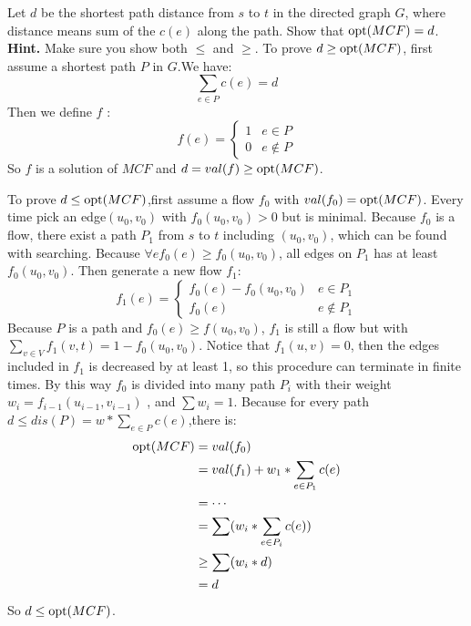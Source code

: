 \documentclass[11pt,a4paper,oneside]{article}
\newcommand{\opt}{\textup{\textrm{opt}}}
\begin{document}
\begin{problem}{2}
	\statement
   Let $d$ be the shortest path distance from $s$ to $t$ in the directed graph $G$, where distance
   means sum of the $c(e)$ along the path. Show that $\opt(MCF) = d$.
   \textbf{Hint.} Make sure you show both $\leq$ and $\geq$.
    \solution
	To prove $d\geq \opt(MCF)$, first assume a shortest path $P$ in $G$.We have: 
	$$\sum_{e \in P} c(e)=d$$
	Then we define $f$ :
	\begin{equation}
	f(e)=
	\begin{cases}
	1& e\in P\\
	0& e\notin P
	\end{cases}
	\end{equation}
	So $f$ is a solution of $MCF$ and $d=val(f)\geq \opt(MCF)$.
	
	To prove $d\leq \opt(MCF)$,first assume a flow $f_0$ with $val(f_0)=\opt(MCF)$.
	Every time pick an edge$(u_0,v_0)$ with $f_0(u_0,v_0)>0$ but is minimal. 
	Because $f_0$ is a flow, there exist a path $P_1$ from $s$ to $t$ including $(u_0,v_0)$, which can be found with searching.
	Because $\forall ef_0(e)\geq f_0(u_0,v_0)$, all edges on $P_1$ has at least $f_0(u_0,v_0)$.
	Then generate a new flow $f_1$:
	\begin{equation}
	f_1(e)=
	\begin{cases}
	f_0(e)-f_0(u_0,v_0)& e\in P_1\\
	f_0(e)& e\notin P_1
	\end{cases}
	\end{equation}
	Because $P$ is a path and $f_0(e)\geq f(u_0,v_0)$, $f_1$ is still a flow but with $\sum_{v \in V} f_1(v,t) = 1-f_0(u_0,v_0)$.
	Notice that $f_1(u,v)=0$, then the edges included in $f_1$ is decreased by at least 1, so this procedure can terminate in finite times.
	By this way $f_0$ is divided into many path $P_i$ with their weight 
	$w_i=f_{i-1}(u_{i-1},v_{i-1})$ , and $\sum w_i=1$. 
	Because for every path $d\leq dis(P)=w*\sum_{e \in P} c(e)$,there is:
	$$	
	\begin {align*}
	\opt(MCF)&=val(f_0)\\
			&=val(f_1)+w_1*\sum_{e \in P_1} c(e)\\
			&=\cdots\\
			&=\sum (w_i*\sum_{e \in P_i} c(e))\\
			&\geq \sum(w_i*d)\\
			&=d
	\end {align*}
	$$
	So $d\leq \opt(MCF)$.
\end{problem}
\end{document}
